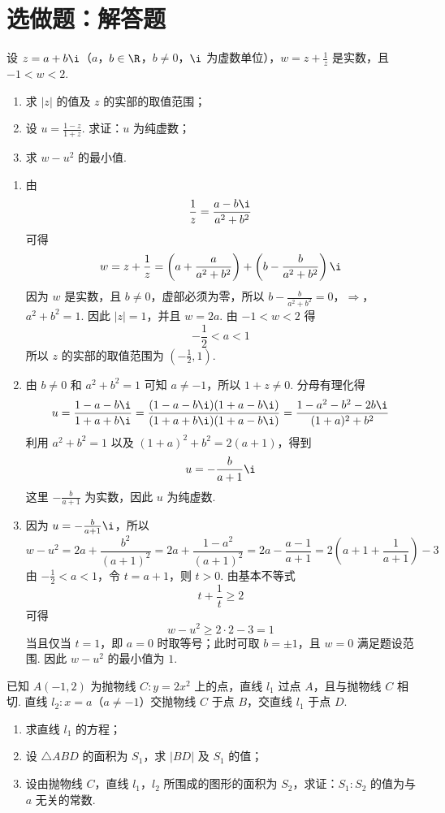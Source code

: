 \section{选做题：解答题}

\begin{problem}[A]
设 \(z=a+b\i\)（\(a\)，\(b\in\R\)，\(b\neq0\)，\(\i\) 为虚数单位），\(w=z+\frac{1}{z}\) 是实数，且 \(-1<w<2\).

\begin{enumerate}
\item 求 \(\left|z\right|\) 的值及 \(z\) 的实部的取值范围；
\item 设 \(u=\frac{1-z}{1+z}\). 求证：\(u\) 为纯虚数；
\item 求 \(w-u^2\) 的最小值.
\end{enumerate}
\end{problem}

\begin{solution}
\begin{enumerate}
\item 由
\[
\frac{1}{z}=\frac{a-b\i}{a^2+b^2}
\]
可得
\[
w=z+\frac{1}{z}
=\left(a+\frac{a}{a^2+b^2}\right)
+\left(b-\frac{b}{a^2+b^2}\right)\i
\]
因为 \(w\) 是实数，且 \(b\neq0\)，虚部必须为零，所以
\(b-\frac{b}{a^2+b^2}=0\)，\(\Longrightarrow\)，\(a^2+b^2=1\).
因此 \(|z|=1\)，并且 \(w=2a\). 由 \(-1<w<2\) 得
\[
-\frac{1}{2}<a<1
\]
所以 \(z\) 的实部的取值范围为 \(\left(-\frac{1}{2},1\right)\).

\item 由 \(b\neq0\) 和 \(a^2+b^2=1\) 可知 \(a\neq-1\)，所以 \(1+z\neq0\). 分母有理化得
\[
u=\frac{1-a-b\i}{1+a+b\i}
=\frac{(1-a-b\i)(1+a-b\i)}{(1+a+b\i)(1+a-b\i)}
=\frac{1-a^2-b^2-2b\i}{(1+a)^2+b^2}
\]
利用 \(a^2+b^2=1\) 以及
\((1+a)^2+b^2=2(a+1)\)，得到
\[
u=-\frac{b}{a+1}\i
\]
这里 \(-\frac{b}{a+1}\) 为实数，因此 \(u\) 为纯虚数.

\item 因为 \(u=-\frac{b}{a+1}\i\)，所以
\[
w-u^2=2a+\frac{b^2}{(a+1)^2}
=2a+\frac{1-a^2}{(a+1)^2}
=2a-\frac{a-1}{a+1}
=2\left(a+1+\frac{1}{a+1}\right)-3
\]
由 \(-\frac{1}{2}<a<1\)，令 \(t=a+1\)，则 \(t>0\). 由基本不等式
\[
t+\frac{1}{t}\geq2
\]
可得
\[
w-u^2\geq2\cdot2-3=1
\]
当且仅当 \(t=1\)，即 \(a=0\) 时取等号；此时可取 \(b=\pm1\)，且 \(w=0\) 满足题设范围. 因此 \(w-u^2\) 的最小值为 \(1\).
\end{enumerate}
\end{solution}

\reuseproblemnumber
\begin{problem}[B]
已知 \(A(-1,2)\) 为抛物线 \(C:y=2x^2\) 上的点，直线 \(l_1\) 过点 \(A\)，且与抛物线 \(C\) 相切. 直线 \(l_2:x=a\)（\(a\neq-1\)）交抛物线 \(C\) 于点 \(B\)，交直线 \(l_1\) 于点 \(D\).

\begin{enumerate}
\item 求直线 \(l_1\) 的方程；
\item 设 \(\triangle ABD\) 的面积为 \(S_1\)，求 \(|BD|\) 及 \(S_1\) 的值；
\item 设由抛物线 \(C\)，直线 \(l_1\)，\(l_2\) 所围成的图形的面积为 \(S_2\)，求证：\(S_1:S_2\) 的值为与 \(a\) 无关的常数.
\end{enumerate}
\end{problem}

